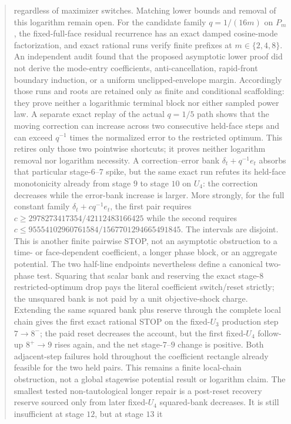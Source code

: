 \documentclass[11pt]{article}
\begin{document}
\begin{abstract}
regardless of maximizer switches.  Matching lower bounds and removal of this
logarithm remain open.  For the candidate family $q=1/(16m)$ on $P_m$, the
fixed-full-face residual recurrence has an exact damped cosine-mode
factorization, and exact rational runs verify finite prefixes at
$m\in\{2,4,8\}$.  An independent audit found that the proposed asymptotic
lower proof did not derive the mode-entry coefficients, anti-cancellation,
rapid-front boundary induction, or a uniform unclipped-envelope margin.
Accordingly those runs and roots are retained only as finite and conditional
scaffolding: they prove neither a logarithmic terminal block nor either
sampled power law.  A separate exact replay of the actual $q=1/5$ path shows
that the moving correction can increase across two consecutive held-face
steps and can exceed $q^{-1}$ times the normalized error to the restricted
optimum.  This retires only those two pointwise shortcuts; it proves neither
logarithm removal nor logarithm necessity.  A correction--error bank
$\delta_t+q^{-1}e_t$ absorbs that particular stage-$6$--$7$ spike, but the
same exact run refutes its held-face monotonicity already from stage $9$ to
stage $10$ on $U_4$: the correction decreases while the error-bank increase
is larger.  More strongly, for the full constant family
$\delta_t+cq^{-1}e_t$, the first pair requires
$c\geq2978273417354/42112483166425$ while the second requires
$c\leq95554102960761584/1567701294665491845$.  The intervals are disjoint.
This is another finite pairwise STOP, not an asymptotic obstruction to a
time- or face-dependent coefficient, a longer phase block, or an aggregate
potential.  The two half-line endpoints nevertheless define a canonical
two-phase test.  Squaring that scalar bank and reserving the exact
stage-$8$ restricted-optimum drop pays the literal coefficient switch/reset
strictly; the unsquared bank is not paid by a unit objective-shock charge.
Extending the same squared bank plus reserve through the complete local chain
gives the first exact rational STOP on the fixed-$U_3$ production step
$7\to8^-$; the paid reset decreases the account, but the first fixed-$U_4$
follow-up $8^+\to9$ rises again, and the net stage-$7$--$9$ change is
positive.  Both adjacent-step failures hold throughout the coefficient
rectangle already feasible for the two held pairs.  This remains a finite
local-chain obstruction, not a global stagewise potential result or
logarithm claim.  The smallest tested non-tautological longer repair is a
post-reset recovery reserve sourced only from later fixed-$U_4$ squared-bank
decreases.  It is still insufficient at stage $12$, but at stage $13$ it

\end{abstract}
\end{document}
